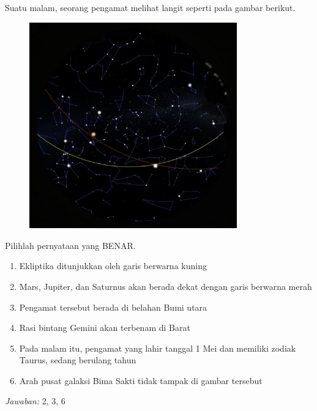 \documentclass[11pt,fleqn]{exam}
\begin{document}
\begin{questions}
\vspace{0.5cm}
\question Suatu malam, seorang pengamat melihat langit seperti pada gambar berikut.
\begin{figure}[H]
\centering
\includegraphics[width=0.8\textwidth]{osp2022_25.png}
\label{fig:osp2022_25}
\end{figure}
Pilihlah pernyataan yang BENAR.
\begin{enumerate}
    \item Ekliptika ditunjukkan oleh garis berwarna kuning
    \item Mars, Jupiter, dan Saturnus akan berada dekat dengan garis berwarna merah
    \item Pengamat tersebut berada di belahan Bumi utara
    \item Rasi bintang Gemini akan terbenam di Barat
    \item Pada malam itu, pengamat yang lahir tanggal 1 Mei dan memiliki zodiak Taurus, sedang berulang tahun
    \item Arah pusat galaksi Bima Sakti tidak tampak di gambar tersebut
\end{enumerate}

\bigskip
\textit{Jawaban: } 2, 3, 6


\end{questions}
\end{document}

